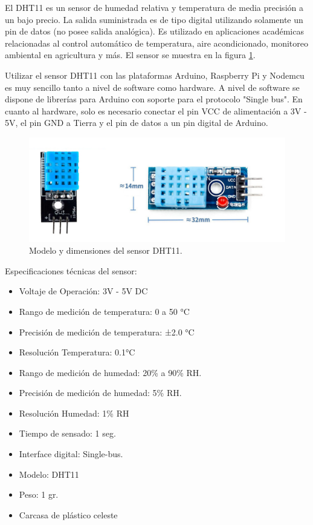 El DHT11 es un sensor de humedad relativa y temperatura de media precisión a un bajo precio. La salida suministrada es de tipo digital utilizando solamente un pin de datos (no posee salida analógica). Es utilizado en aplicaciones académicas relacionadas al control automático de temperatura, aire acondicionado, monitoreo ambiental en agricultura y más. El sensor se muestra en la figura \ref{fig:dht11}.

Utilizar el sensor DHT11 con las plataformas Arduino, Raspberry Pi y Nodemcu es muy sencillo tanto a nivel de software como hardware. A nivel de software se dispone de librerías para Arduino con soporte para el protocolo "Single bus". En cuanto al hardware, solo es necesario conectar el pin VCC de alimentación a 3V - 5V, el pin GND a Tierra y el pin de datos a un pin digital de Arduino. 

\begin{figure}[htbp]
	\centering
	\includegraphics[width=.8\textwidth]{./Figures/dht11.jpg}
	\caption{Modelo y dimensiones del sensor DHT11. }

	\label{fig:dht11}
\end{figure}

Especificaciones técnicas del sensor:

\begin{itemize}
\item Voltaje de Operación: 3V - 5V DC
\item Rango de medición de temperatura: 0 a 50 °C
\item Precisión de medición de temperatura: ±2.0 °C
\item Resolución Temperatura: 0.1°C
\item Rango de medición de humedad: 20\% a 90\% RH.
\item Precisión de medición de humedad: 5\% RH.
\item Resolución Humedad: 1\% RH
\item Tiempo de sensado: 1 seg.
\item Interface digital: Single-bus.
\item Modelo: DHT11
\item Peso: 1 gr.
\item Carcasa de plástico celeste
\end{itemize}


